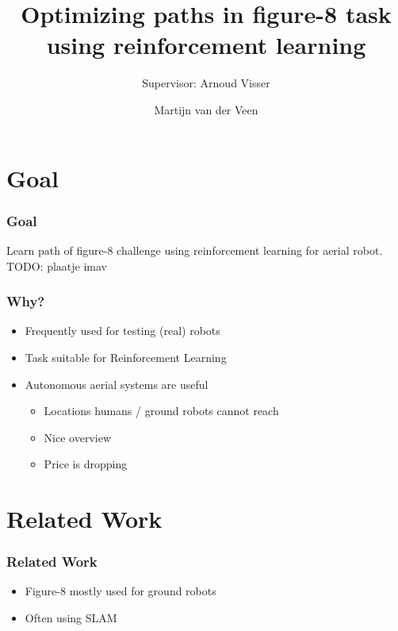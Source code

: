 \documentclass[10pt]{beamer}
\title{Optimizing paths in figure-8 task using reinforcement learning}
\subtitle{\small Supervisor: Arnoud Visser}
\author{Martijn van der Veen}
\institute{University of Amsterdam}
\begin{document}
\begin{frame}
\begin{center}


\end{center}
\titlepage
\end{frame}

% 

\begin{frame}
\tableofcontents
\end{frame}

\section{Goal}
\begin{frame}
 \frametitle{Goal}
 Learn path of figure-8 challenge using reinforcement learning for aerial robot.
 TODO: plaatje imav
\end{frame}

\begin{frame}
 \frametitle{Why?}
 \begin{itemize}
   \item Frequently used for testing (real) robots
   \item Task suitable for Reinforcement Learning
   \item Autonomous aerial systems are useful
   \begin{itemize}
     \item Locations humans / ground robots cannot reach
     \item Nice overview
     \item Price is dropping
   \end{itemize}
 \end{itemize}
\end{frame}

\section{Related Work}
\begin{frame}
 \frametitle{Related Work}
 \begin{itemize}
   \item Figure-8 mostly used for ground robots
   \item Often using SLAM
 \end{itemize}
\end{frame}
\end{document}
